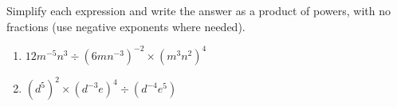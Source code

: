 Simplify each expression and write the answer as a product of powers, with no fractions (use negative exponents where needed).
\begin{enumerate}
\item[(a)] $12m^{-5}n^{3}\div\left(6mn^{-3}\right)^{-2}\times\left(m^{3}n^{2}\right)^{4}$
\item[(b)] $\left(d^{5}\right)^{2}\times\left(d^{-3}e\right)^{4}\div\left(d^{-4}e^{5}\right)$
\end{enumerate}
